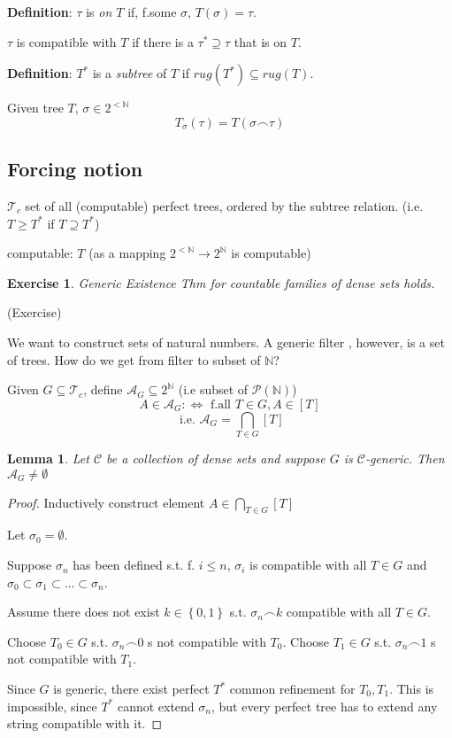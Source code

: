 \documentclass[12pt]{article}
\newcommand{\Nat}{\ensuremath{\mathbb{N}}}
\newcommand{\Pow}[1]{\ensuremath{\mathcal{P}(#1)}}
\newcommand{\defn}{\textbf{Definition}: }
\begin{document}
\defn $\tau$ is \emph{on $T$} if, f.some $\sigma$, $T(\sigma) = \tau$.

$\tau$ is compatible with $T$ if there is a 
$\tau^* \supseteq \tau$ that is on $T$.

\defn $T^*$ is a \emph{subtree} of $T$ if $rug(T^*) \subseteq rug(T)$.

Given tree $T$, $\sigma \in 2^{<\Nat}$
\[
 T_\sigma(\tau) = T(\sigma\frown\tau)
\]

\subsection{Forcing notion}
$\mathcal{T}_c$ set of all (computable) perfect trees, 
ordered by the subtree relation.
(i.e. $T \ge T^*$ if $T \supseteq T^*$)

computable: $T$ (as a mapping $2^{<\Nat} \rightarrow 2^{\Nat}$ is computable)

\newtheorem*{genex}{Exercise} 
\begin{genex}
  Generic Existence Thm for countable families of dense sets holds.
\end{genex}
(Exercise)

We want to construct sets of natural numbers.
A generic filter , however, is a set of trees.
How do we get from filter to subset of $\Nat$?

Given $G \subseteq \mathcal{T}_c$, define $\mathcal{A}_G \subseteq 2^\Nat$ (i.e subset of $\Pow{\Nat}$)
\[
A \in \mathcal{A}_G: \Leftrightarrow \text{ f.all } T \in G, A \in [T]
\]
\[
\text{ i.e. }
\mathcal{A}_G = \bigcap_{T \in G} [T]
\]

\newtheorem*{lem}{Lemma}
\begin{lem}
  Let $\mathcal{C}$ be a collection of dense sets 
  and suppose $G$ is $\mathcal{C}$-generic.
  Then $\mathcal{A}_G \ne \emptyset$
\end{lem}
\begin{proof}
  Inductively construct element $A \in \bigcap_{T \in G} [T]$

  Let $\sigma_0 = \emptyset$.

  Suppose $\sigma_n$ has been defined s.t. f. $i\le n$,
  $\sigma_i$ is compatible with all $T \in G$
  and $\sigma_0 \subset \sigma_1 \subset \dots \subset \sigma_n$.

  Assume there does not exist $k \in \left\{0,1\right\}$ s.t.
  $\sigma_n \frown k$ compatible with all $T \in G$.

  Choose $T_0 \in G$ s.t. $\sigma_n \frown 0$ s not compatible with $T_0$.
  Choose $T_1 \in G$ s.t. $\sigma_n \frown 1$ s not compatible with $T_1$.

  Since $G$ is generic, there exist perfect $T^*$ common
  refinement for $T_0, T_1$.
  This is impossible, since $T^*$ cannot extend $\sigma_n$,
  but every perfect tree has to extend any string compatible with it.
\end{proof}
\end{document}
